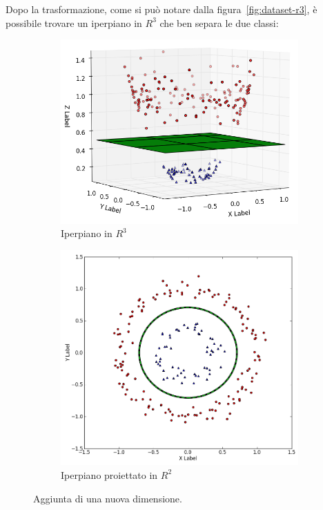 \documentclass[oneside]{book}
\begin{document}
\noindent
Dopo la trasformazione, come si può notare dalla figura~\ref{fig:dataset-r3}, è possibile trovare un iperpiano in $R^3$ che ben separa le due classi:

\begin{figure}[!h]

	\begin{subfigure}[b]{0.48\textwidth}
		
		\includegraphics[width=\linewidth]{assets/svm-separable-1.png}
		\caption{Iperpiano in $R^3$}
		\label{fig:iperpiano-r3}
	\end{subfigure}
	\hfill
	\begin{subfigure}[b]{0.48\textwidth}
		\includegraphics[width=\linewidth]{assets/svm-separable-2.png}
		\caption{Iperpiano proiettato in $R^2$}
		\label{fig:iperpiano-r2}
	\end{subfigure}%
	\caption[Caption for LOF]{Aggiunta di una nuova dimensione.\footnotemark}
\end{figure}
\end{document}
